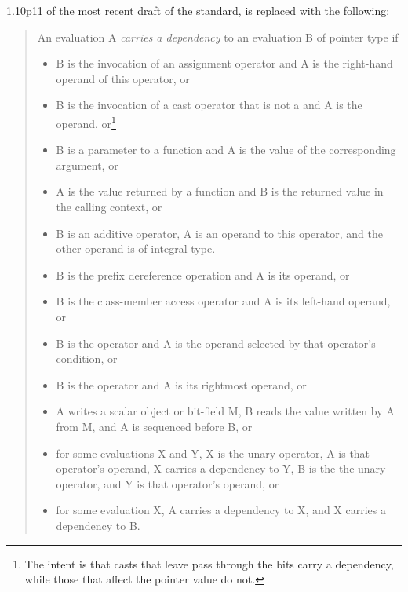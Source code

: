\documentclass[letterpaper,twocolumn,10pt]{article}
\begin{document}
1.10p11 of the most recent draft of the standard\cite{RichardSmith2015N4527},
is replaced with the following:

\begin{quote}
	An evaluation A \emph{carries a dependency} to an evaluation B
	of pointer type if
	\begin{itemize}
	\item	B is the invocation of an assignment operator and A is the
		right-hand operand of this operator, or
	\item	B is the invocation of a cast operator that is not
		a  and A is the operand, or\footnote{
			The intent is that casts that leave pass through the
			bits carry a dependency, while those that affect
			the pointer value do not.}
	\item	B is a parameter to a function and A is the value of the
		corresponding argument, or
	\item	A is the value returned by a function and B is the returned
		value in the calling context, or
	\item	B is an additive operator, A is an operand to this operator,
		and the other operand is of integral type.
	\item	B is the prefix \co{*} dereference operation and A is its
		operand, or
	\item	B is the \co{->} class-member access operator and A is its
		left-hand operand, or
	\item	B is the  operator and A is the operand selected by
		that operator's condition, or
	\item	B is the \co{,} operator and A is its rightmost operand, or
	\item	A writes a scalar object or bit-field M, B reads the value
		written by A from M, and A is sequenced before B, or
	\item	for some evaluations X and Y, X is the unary \co{&}
		operator, A is that operator's operand, X carries a
		dependency to Y, B is the the unary \co{*} operator,
		and Y is that operator's operand, or
	\item	for some evaluation X, A carries a dependency to X,
		and X carries a dependency to B.
	\end{itemize}


\end{quote}
\end{document}
